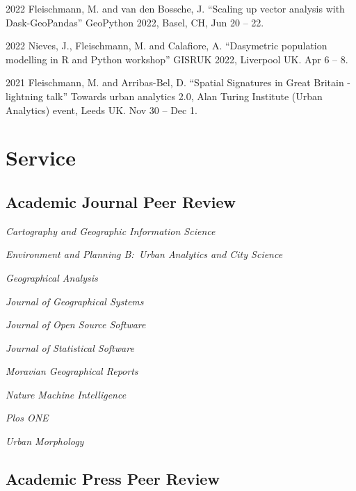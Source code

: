 \documentclass[12pt,a4paper]{report}
\newcommand{\listitemspace}{0.25em}
\renewenvironment{itemize}
{\begin{list}{}{\setlength{\leftmargin}{0em}
                \setlength{\parskip}{0em}
                \setlength{\itemsep}{\listitemspace}
                \setlength{\parsep}{\listitemspace}}}
{\end{list}}
\begin{document}
    \begin{tablist}

        \item[2022] \tab{}Fleischmann, M. and van den Bossche, J. \enquote{Scaling up vector analysis with Dask-GeoPandas} GeoPython 2022, Basel, CH, Jun 20 -- 22.
        \item[2022] \tab{}Nieves, J., Fleischmann, M. and Calafiore, A. \enquote{Dasymetric population modelling in R and Python workshop} GISRUK 2022, Liverpool UK. Apr 6 -- 8.
        \item[2021] \tab{}Fleischmann, M. and Arribas-Bel, D. \enquote{Spatial Signatures in Great Britain - lightning talk} Towards urban analytics 2.0, Alan Turing Institute (Urban Analytics) event, Leeds UK. Nov 30 -- Dec 1.

    \end{tablist}


    \section*{Service}

    \subsection*{Academic Journal Peer Review}

    \begin{itemize}

        \item \textit{Cartography and Geographic Information Science}
        \item \textit{Environment and Planning B:\ Urban Analytics and City Science}
        \item \textit{Geographical Analysis}
        \item \textit{Journal of Geographical Systems}
        \item \textit{Journal of Open Source Software}
        \item \textit{Journal of Statistical Software}
        \item \textit{Moravian Geographical Reports}
        \item \textit{Nature Machine Intelligence}
        \item \textit{Plos ONE}
        \item \textit{Urban Morphology}

    \end{itemize}

    \subsection*{Academic Press Peer Review}
\end{document}
